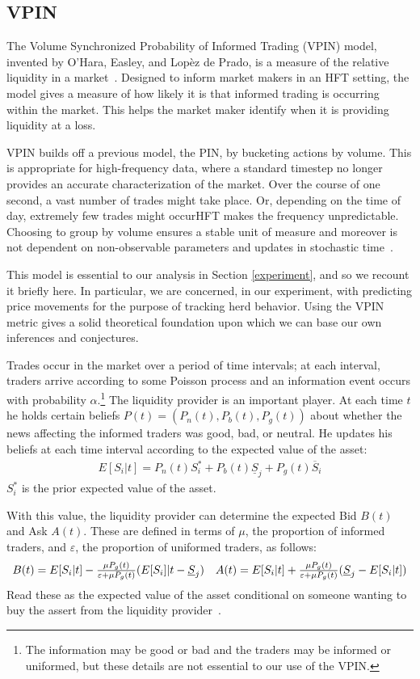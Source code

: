 \subsection{VPIN}
The Volume Synchronized Probability of Informed Trading (VPIN) model, invented by O'Hara, Easley, and Lop\`ez de Prado, is a measure of the relative liquidity in a market~\cite{vpin}.
Designed to inform market makers in an HFT setting, the model gives a measure of how likely it is that informed trading is occurring within the market.
This helps the market maker identify when it is providing liquidity at a loss. 

VPIN builds off a previous model, the PIN, by bucketing actions by volume. 
This is appropriate for high-frequency data, where a standard timestep no longer provides an accurate characterization of the market.
Over the course of one second, a vast number of trades might take place.
Or, depending on the time of day, extremely few trades might occur\textemdash HFT makes the frequency unpredictable.
Choosing to group by volume ensures a stable unit of measure and moreover is not dependent on non-observable parameters and updates in stochastic time~\cite[4]{vpin}.

This model is essential to our analysis in Section \ref{experiment}, and so we recount it briefly here. 
In particular, we are concerned, in our experiment, with predicting price movements for the purpose of tracking herd behavior. 
Using the VPIN metric gives a solid theoretical foundation upon which we can base our own inferences and conjectures.

Trades occur in the market over a period of time intervals; at each interval, traders arrive according to some Poisson process and an information event occurs with probability $\alpha$.\footnote{The information may be good or bad and the traders may be informed or uniformed, but these details are not essential to our use of the VPIN.}
The liquidity provider is an important player.
At each time $t$ he holds certain beliefs $P(t) = (P_n(t), P_b(t), P_g(t))$ about whether the news affecting the informed traders was good, bad, or neutral.
He updates his beliefs at each time interval according to the expected value of the asset:
\begin{align*}
  E[S_i |t] = P_n(t)S_i^* + P_b(t)\underline{S}_j + P_g(t)\overline{S}_i
\end{align*}
$S_i^*$ is the prior expected value of the asset.

With this value, the liquidity provider can determine the expected Bid $B(t)$ and Ask $A(t)$.
These are defined in terms of $\mu$, the proportion of informed traders, and $\varepsilon$, the proportion of uniformed traders, as follows:
\[\begin{array}{r l}
  B(t) = E[S_i|t] - 
    \frac{\mu P_g(t)}{\varepsilon + \mu P_g(t)}
    (E[S_i]
    |t -
    \underline{S}_j) 
    & 
  A(t) = E[S_i|t] + \frac{\mu P_g(t)}{\varepsilon + \mu P_g(t)}(\underline{S}_j - E[S_i|t])
\end{array}\]
Read these as the expected value of the asset conditional on someone wanting to buy the assert from the liquidity provider~\cite[10]{vpin}.

